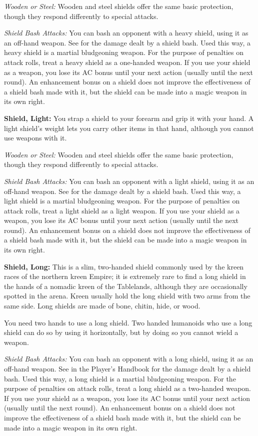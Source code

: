 \textit{Wooden or Steel:} Wooden and steel shields offer the same basic protection, though they respond differently to special attacks.

\textit{Shield Bash Attacks:} You can bash an opponent with a heavy shield, using it as an off-hand weapon. See  for the damage dealt by a shield bash. Used this way, a heavy shield is a martial bludgeoning weapon. For the purpose of penalties on attack rolls, treat a heavy shield as a one-handed weapon. If you use your shield as a weapon, you lose its AC bonus until your next action (usually until the next round). An enhancement bonus on a shield does not improve the effectiveness of a shield bash made with it, but the shield can be made into a magic weapon in its own right.

\textbf{Shield, Light:} You strap a shield to your forearm and grip it with your hand. A light shield's weight lets you carry other items in that hand, although you cannot use weapons with it.

\textit{Wooden or Steel:} Wooden and steel shields offer the same basic protection, though they respond differently to special attacks.

\textit{Shield Bash Attacks:} You can bash an opponent with a light shield, using it as an off-hand weapon. See  for the damage dealt by a shield bash. Used this way, a light shield is a martial bludgeoning weapon. For the purpose of penalties on attack rolls, treat a light shield as a light weapon. If you use your shield as a weapon, you lose its AC bonus until your next action (usually until the next round). An enhancement bonus on a shield does not improve the effectiveness of a shield bash made with it, but the shield can be made into a magic weapon in its own right.

\textbf{Shield, Long:} This is a slim, two-handed shield commonly used by the kreen races of the northern kreen Empire; it is extremely rare to find a long shield in the hands of a nomadic kreen of the Tablelands, although they are occasionally spotted in the arena. Kreen usually hold the long shield with two arms from the same side. Long shields are made of bone, chitin, hide, or wood.

You need two hands to use a long shield. Two handed humanoids who use a long shield can do so by using it horizontally, but by doing so you cannot wield a weapon.

\textit{Shield Bash Attacks:} You can bash an opponent with a long shield, using it as an off-hand weapon. See  in the Player's Handbook for the damage dealt by a shield bash. Used this way, a long shield is a martial bludgeoning weapon. For the purpose of penalties on attack rolls, treat a long shield as a two-handed weapon. If you use your shield as a weapon, you lose its AC bonus until your next action (usually until the next round). An enhancement bonus on a shield does not improve the effectiveness of a shield bash made with it, but the shield can be made into a magic weapon in its own right.

